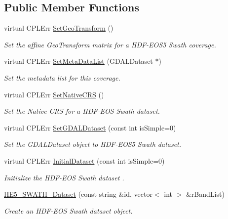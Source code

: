 \subsection*{Public Member Functions}
\begin{DoxyCompactItemize}
\item 
virtual CPLErr \hyperlink{classHE5__SWATH__Dataset_a77dcaecf2d402d69eb3ba0a21536e43e}{SetGeoTransform} ()
\begin{DoxyCompactList}\small\item\em Set the affine GeoTransform matrix for a HDF-\/EOS5 Swath coverage. \end{DoxyCompactList}\item 
virtual CPLErr \hyperlink{classHE5__SWATH__Dataset_a59d87c150c064547f4a9fe4aaa1215b0}{SetMetaDataList} (GDALDataset $\ast$)
\begin{DoxyCompactList}\small\item\em Set the metadata list for this coverage. \end{DoxyCompactList}\item 
virtual CPLErr \hyperlink{classHE5__SWATH__Dataset_a28eeb972e11c417dfef63d96f950318d}{SetNativeCRS} ()
\begin{DoxyCompactList}\small\item\em Set the Native CRS for a HDF-\/EOS Swath dataset. \end{DoxyCompactList}\item 
virtual CPLErr \hyperlink{classHE5__SWATH__Dataset_a549c0943284f1bb4dada2aa5cb8e1f80}{SetGDALDataset} (const int isSimple=0)
\begin{DoxyCompactList}\small\item\em Set the GDALDataset object to HDF-\/EOS5 Swath dataset. \end{DoxyCompactList}\item 
virtual CPLErr \hyperlink{classHE5__SWATH__Dataset_a2dabd5794784f3accdd3e70b0b00ea20}{InitialDataset} (const int isSimple=0)
\begin{DoxyCompactList}\small\item\em Initialize the HDF-\/EOS Swath dataset . \end{DoxyCompactList}\item 
\hyperlink{classHE5__SWATH__Dataset_a4ef63a16c0d5e7dea64f88596584237a}{HE5\_\-SWATH\_\-Dataset} (const string \&id, vector$<$ int $>$ \&rBandList)
\begin{DoxyCompactList}\small\item\em Create an HDF-\/EOS Swath dataset object. \end{DoxyCompactList}\item 

\end{DoxyCompactItemize}
